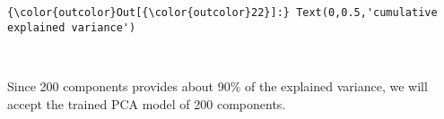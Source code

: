 \documentclass[11pt]{article}
\begin{document}
\begin{Verbatim}[commandchars=\\\{\}]
{\color{outcolor}Out[{\color{outcolor}22}]:} Text(0,0.5,'cumulative explained variance')
\end{Verbatim}
            
    \begin{center}
    \end{center}
    { \hspace*{\fill} \\}
    
    Since 200 components provides about 90\% of the explained variance, we
will accept the trained PCA model of 200 components.
\newpage
\end{document}

